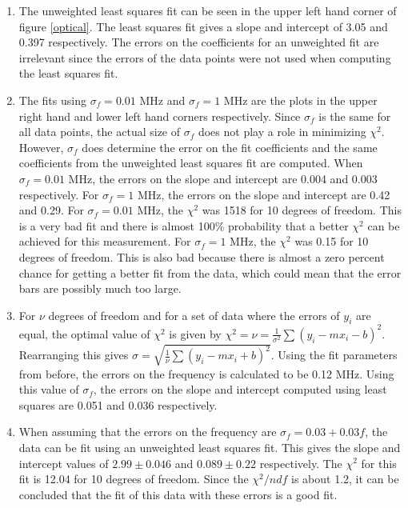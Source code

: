 \documentclass[11pt,letterpaper]{article}
\begin{document}
\begin{enumerate}
\item The unweighted least squares fit can be seen in the upper left hand corner
    of figure \ref{optical}. The least squares fit gives a slope and intercept
    of 3.05 and 0.397 respectively. The errors on the coefficients for an
    unweighted fit are irrelevant since the errors of the data points were not
    used when computing the least squares fit.
\item The fits using $\sigma_f = 0.01$ MHz and $\sigma_f = 1$ MHz are the plots
    in the upper right hand and lower left hand corners respectively. Since
    $\sigma_f$ is the same for all data points, the actual size of $\sigma_f$
    does not play a role in minimizing $\chi^2$. However, $\sigma_f$ does
    determine the error on the fit coefficients and the same coefficients from
    the unweighted least squares fit are computed. When $\sigma_f = 0.01$ MHz,
    the errors on the slope and intercept are 0.004 and 0.003 respectively. For
    $\sigma_f = 1$ MHz, the errors on the slope and intercept are 0.42 and 0.29.
    For $\sigma_f = 0.01$ MHz, the $\chi^2$ was 1518 for 10 degrees of freedom.
    This is a very bad fit and there is almost 100\% probability that a better
    $\chi^2$ can be achieved for this measurement. For $\sigma_f = 1$ MHz, the
    $\chi^2$ was 0.15 for 10 degrees of freedom. This is also bad because there
    is almost a zero percent chance for getting a better fit from the data,
    which could mean that the error bars are possibly much too large.
\item For $\nu$ degrees of freedom and for a set of data where the errors of
    $y_i$ are equal, the optimal value of $\chi^2$ is given by $\displaystyle
    \chi^2 = \nu = \frac{1}{\sigma^2} \sum \left(y_i - mx_i - b \right)^2$.
    Rearranging this gives $\displaystyle \sigma = \sqrt{\frac{1}{\nu} \sum
    \left(y_i - mx_i + b \right)^2}$. Using the fit parameters from before, the
    errors on the frequency is calculated to be 0.12 MHz. Using this value of
    $\sigma_f$, the errors on the slope and intercept computed using least
    squares are 0.051 and 0.036 respectively.
\item When assuming that the errors on the frequency are $\sigma_f = 0.03 +
    0.03f$, the data can be fit using an unweighted least squares fit. This
    gives the slope and intercept values of $2.99 \pm 0.046$ and $0.089 \pm
    0.22$ respectively. The $\chi^2$ for this fit is 12.04 for 10 degrees of
    freedom. Since the $\chi^2/ndf$ is about 1.2, it can be concluded that the
    fit of this data with these errors is a good fit.
\end{enumerate}
\end{document}
